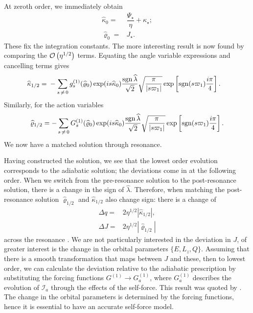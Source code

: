 At zeroth order, we immediately obtain
\begin{align}
\widehat{\kappa}_0 = {} & \dfrac{\Psi_\star}{\eta} + \kappa_\star; \\
\widehat{\varrho}_0 = {} & J_\star.
\end{align}
These fix the integration constants. The more interesting result is now found by comparing the $\mathcal{O}\left({\eta^{1/2}}\right)$ terms. Equating the angle variable expressions and cancelling terms gives
\begin{align}
\widehat{\kappa}_{1/2} = {} & -\sum_{s\,\neq\,0}g_s^{(1)}(\widehat{\varrho}_0)\exp(is \widehat{\kappa}_0)\dfrac{\operatorname{sgn} \widehat{\lambda}}{\sqrt{2}}\sqrt{\dfrac{\pi}{|s\varpi_1|}}\exp\left[\operatorname{sgn}(s\varpi_1)\dfrac{i\pi}{4}\right].
\end{align}
Similarly, for the action variables
\begin{equation}
\widehat{\varrho}_{1/2} = -\sum_{s\,\neq\,0}G_s^{(1)}(\widehat{\varrho}_0)\exp(is \widehat{\kappa}_0)\dfrac{\operatorname{sgn} \widehat{\lambda}}{\sqrt{2}}\sqrt{\dfrac{\pi}{|s\varpi_1|}}\exp\left[\operatorname{sgn}(s\varpi_1)\dfrac{i\pi}{4}\right].
\label{eq:J-1/2}
\end{equation}
We now have a matched solution through resonance.

Having constructed the solution, we see that the lowest order evolution corresponds to the adiabatic solution; the deviations come in at the following order. When we switch from the pre-resonance solution to the post-resonance solution, there is a change in the sign of $\widehat{\lambda}$. Therefore, when matching the post-resonance solution $\widehat{\varrho}_{1/2}$ and $\widehat{\kappa}_{1/2}$ also change sign: there is a change of
\begin{align}
\Delta q = {} & 2 \eta^{1/2}\left|\widehat{\kappa}_{1/2}\right|, \\
\Delta J = {} & 2 \eta^{1/2}\left|\widehat{\varrho}_{1/2}\right|
\label{eq:jumps}
\end{align}
across the resonance \citep{Kevorkian1987}. We are not particularly interested in the deviation in $J$, of greater interest is the change in the orbital parameters $\{E,L_z,Q\}$. Assuming that there is a smooth transformation that maps between $J$ and these, then to lowest order, we can calculate the deviation relative to the adiabatic prescription by substituting the forcing functions $G^{(1)} \rightarrow G_a^{(1)}$, where $G_a^{(1)}$ describes the evolution of $\mathcal{I}_a$ through the effects of the self-force. This result was quoted by \citet{Flanagan2012}. The change in the orbital parameters is determined by the forcing functions, hence it is essential to have an accurate self-force model.

